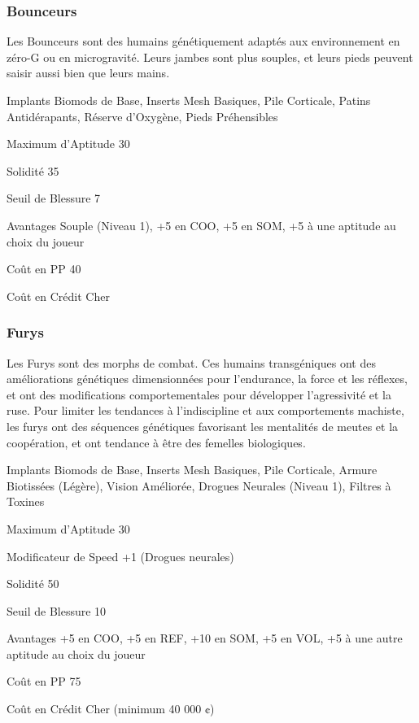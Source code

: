 \subsubsection{Bounceurs} \label{sec:starting-bouncers} 

Les Bounceurs sont des humains génétiquement adaptés aux environnement en zéro-G ou en microgravité. Leurs jambes sont plus souples, et leurs pieds peuvent saisir aussi bien que leurs mains. 

\begin{description*} \item[Implants] Biomods de Base, Inserts Mesh Basiques, Pile Corticale, Patins Antidérapants, Réserve d'Oxygène, Pieds Préhensibles\item[Maximum d'Aptitude] 30 \item[Solidité] 35 \item[Seuil de Blessure] 7 \item[Avantages] Souple (Niveau 1), +5 en COO, +5 en SOM, +5 à une aptitude au choix du joueur\item[Coût en PP] 40 \item[Coût en Crédit] Cher \end{description*} 

\subsubsection{Furys} \label{sec:starting-furies} 

Les Furys sont des morphs de combat. Ces humains transgéniques ont des améliorations génétiques dimensionnées pour l'endurance, la force et les réflexes, et ont des modifications comportementales pour développer l'agressivité et la ruse. Pour limiter les tendances à l'indiscipline et aux comportements machiste, les furys ont des séquences génétiques favorisant les mentalités de meutes et la coopération, et ont tendance à être des femelles biologiques. 

\begin{description*} \item[Implants] Biomods de Base, Inserts Mesh Basiques, Pile Corticale, Armure Biotissées (Légère), Vision Améliorée, Drogues Neurales (Niveau 1), Filtres à Toxines\item[Maximum d'Aptitude] 30 \item[Modificateur de Speed] +1 (Drogues neurales) \item [Solidité] 50 \item[Seuil de Blessure] 10 \item[Avantages] +5 en COO, +5 en REF, +10 en SOM, +5 en VOL, +5 à une autre aptitude au choix du joueur\item[Coût en PP] 75 \item[Coût en Crédit] Cher (minimum 40 000 ¢) \end{description*} 

